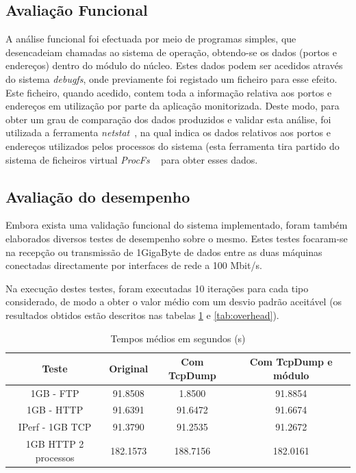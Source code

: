 \documentclass[a4paper]{llncs}
\begin{document}
\subsection{Avaliação Funcional}
A análise funcional foi efectuada por meio de programas simples, que desencadeiam chamadas ao sistema de operação, obtendo-se os dados (portos e endereços) dentro do módulo do núcleo. Estes dados podem ser acedidos através do sistema \textit{debugfs}, onde previamente foi registado um ficheiro para esse efeito. Este ficheiro, quando acedido, contem toda a informação relativa aos portos e endereços em utilização por parte da aplicação monitorizada.
Deste modo, para obter um grau de comparação dos dados produzidos e validar esta análise, foi utilizada a ferramenta \textit{netstat}~\cite{netstat}, na qual indica os dados relativos aos portos e endereços utilizados pelos processos do sistema (esta ferramenta tira partido do sistema de ficheiros virtual \textit{ProcFs} ~\cite{procfskernel} para obter esses dados.

\subsection{Avaliação do desempenho}
Embora exista uma validação funcional do sistema implementado, foram também elaborados diversos testes de desempenho sobre o mesmo. Estes testes focaram-se na recepção ou transmissão de 1GigaByte de dados entre as duas máquinas conectadas directamente por interfaces de rede a 100 Mbit/s.

Na execução destes testes, foram executadas 10 iterações para cada tipo considerado, de modo a obter o valor médio com um desvio padrão aceitável (os resultados obtidos estão descritos nas tabelas \ref{tab:desempenho} e \ref{tab:overhead}).

\begin{table}
\begin{center}

\begin{tabular}{ | c | c | c | c |  }
\hline
Teste & \hspace {0.3cm} Original \hspace {0.3cm}& \hspace {0.2cm} Com TcpDump \hspace {0.2cm} & Com TcpDump e módulo \\
\hline
1GB - FTP & 91.8508	& 1.8500 & 91.8854 \\
1GB - HTTP & 91.6391 & 91.6472 & 91.6674 \\ 
IPerf - 1GB TCP & 91.3790	& 91.2535	& 91.2672 \\
\hline
\hline
1GB HTTP 2 processos & 182.1573 & 188.7156 & 182.0161 \\
\hline
\end{tabular}
\caption{Tempos médios em segundos (s)}
\label{tab:desempenho}
\end{center}
\end{table}
\end{document}
